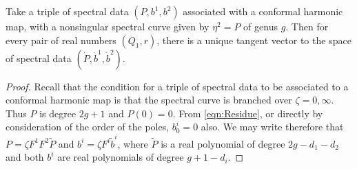 \begin{lem}[Conformal]
Take a triple of spectral data $(P,b^1,b^2)$ associated with a conformal harmonic map, with a nonsingular spectral curve given by $η^2 = P$ of genus $g$. Then for every pair of real numbers $(Q_1,r)$, there is a unique tangent vector to the space of spectral data $(\dot P, \dot b^1, \dot b^2)$.

\begin{proof}
Recall that the condition for a triple of spectral data to be associated to a conformal harmonic map is that the spectral curve is branched over $ζ=0,\infty$. Thus $P$ is degree $2g+1$ and $P(0)=0$. From \eqref{eqn:Residue}, or directly by consideration of the order of the poles, $b^i_0 = 0$ also. We may write therefore that $P= ζF^1F^2\tilde{P}$ and $b^i = ζF^i \tilde{b}^i$, where $\tilde{P}$ is a real polynomial of degree $2g - d_1 - d_2$ and both $b^i$ are real polynomials of degree $g+1-d_i$.


\end{proof}
\end{lem}
